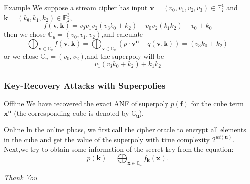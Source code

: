 \documentclass[notheorems, aspectratio=169]{beamer}
\def\bd#1{\boldsymbol{#1}}
\begin{document}
\begin{frame}
    \begin{block}{Example}
        We suppose a stream cipher has input $\bd{v}=(v_0,v_1,v_2,v_3) \in \mathbb{F}^4_2$ and $\bd{k}=(k_0,k_1,k_2) \in \mathbb{F}^3_2$, 
        $$
            f(\bd{v},\bd{k})=v_0v_1v_2(v_3k_0+k_2)+v_0v_2(k_1k_2)+v_0+k_0
        $$
        then we chose $\mathbb{C}_u=(v_0,v_1,v_2)$,and calculate 
        $$
        \bigoplus_{\boldsymbol{v} \in \mathbb{C}_u}f(\boldsymbol{v},\boldsymbol{k})=\bigoplus_{\boldsymbol{v}\in \mathbb{C}_u}(p \cdot \boldsymbol{v}^{\boldsymbol{u}}+q(\boldsymbol{v},\boldsymbol{k}))
        =(v_3k_0+k_2)
        $$
        or we chose $\mathbb{C}_u=(v_0,v_2)$,and the superpoly will be 
        $$
            v_1(v_3k_0+k_2)+k_1k_2
        $$



    \end{block}



\end{frame}


\begin{frame}
    \frametitle{Key-Recovery Attacks with Superpolies}
    \begin{block}{Offline}
        We have recovered the exact ANF of superpoly $p(\bd{f})$ for the cube term $\bd{x}^{\bd{u}}$ (the 
        corresponding cube is denoted by $\mathbb{C}_{\bd{u}}$).
    \end{block}
    \begin{block}{Online}
        In the online phase, we first call the cipher oracle to encrypt all elements in the cube and get the value of
        the superpoly with time complexity $2^{wt(\bd{u})}$.\\
        Next,we try to obtain some information of the secret key from the equation:
        $$
        p(\bd{k})=\bigoplus _{\bd{x}\in \mathbb{C}_{\bd{u}}} f_{\bd{k}}(\bd{x}).
        $$
        
    \end{block}
\end{frame}

\begin{frame}{}
    \centering \Huge
    \emph{Thank You}
  \end{frame}
\end{document}
